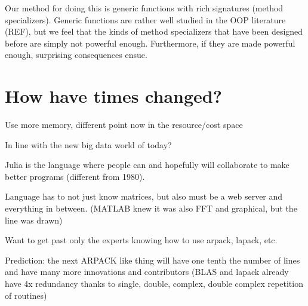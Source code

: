 Our method for doing this is generic functions with rich signatures
(method specializers). Generic functions are rather well studied in the
OOP literature (REF), but we feel that the kinds of method specializers
that have been designed before are simply not powerful enough.
Furthermore, if they are made powerful enough, surprising consequences
ensue.



\section{How have times changed?}

Use more memory, different point now in the resource/cost space

In line with the new big data world of today?

Julia is the language where people can and hopefully will collaborate
to make better programs (different from 1980).

Language has to not just know matrices, but also must be a web server
and everything in between. (MATLAB knew it was also FFT and graphical,
but the line was drawn)

Want to get past only the experts knowing how to use arpack, lapack,
etc.

Prediction: the next ARPACK like thing will have one tenth the number
of lines and have many more innovations and contributors (BLAS and
lapack already have 4x redundancy thanks to single, double, complex,
double complex repetition of routines)
